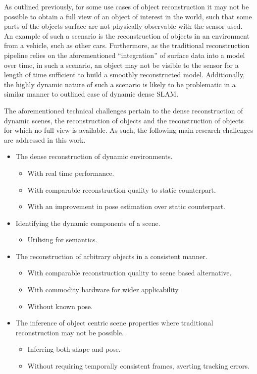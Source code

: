 As outlined previously, for some use cases of object reconstruction it may not be possible to obtain a 
full view of an object of interest in the world, such that some parts of the objects surface are not 
physically observable with the sensor used. An example of such a scenario is the reconstruction of 
objects in an environment from a vehicle, such as other cars. Furthermore, as the traditional reconstruction 
pipeline relies on the aforementioned ``integration'' of surface data into a model over time, in such a 
scenario, an object may not be visible to the sensor for a length of time sufficient to build a smoothly 
reconstructed model. Additionally, the highly dynamic nature of such a scenario is likely to be problematic 
in a similar manner to outlined case of dynamic dense SLAM.

The aforementioned technical challenges pertain to the dense reconstruction of dynamic scenes, the 
reconstruction of objects and the reconstruction of objects for which no full view is available. As 
such, the following main research challenges are addressed in this work.
\begin{itemize}
  \item The dense reconstruction of dynamic environments.
  \begin{itemize}
    \item With real time performance.
    \item With comparable reconstruction quality to static counterpart.
    \item With an improvement in pose estimation over static counterpart.
  \end{itemize}
  \item Identifying the dynamic components of a scene.
  \begin{itemize}
    \item Utilising for semantics.
  \end{itemize}
  \item The reconstruction of arbitrary objects in a consistent manner.
  \begin{itemize}
    \item With comparable reconstruction quality to scene based alternative.
    \item With commodity hardware for wider applicability.
    \item Without known pose.
  \end{itemize}
  \item The inference of object centric scene properties where traditional reconstruction 
may not be possible.
  \begin{itemize}
    \item Inferring both shape and pose.
    \item Without requiring temporally consistent frames, averting tracking errors.
  \end{itemize}
\end{itemize}

